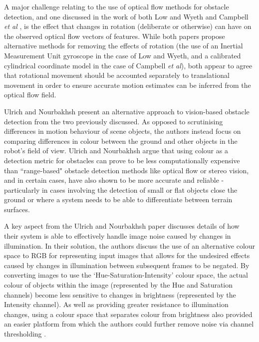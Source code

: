 
A major challenge relating to the use of optical flow methods for obstacle detection, and one discussed in the work of both Low and Wyeth \cite{wyeth} and Campbell \textit{et al} \cite{campbell}, is the effect that changes in rotation (deliberate or otherwise) can have on the observed optical flow vectors of features. While both papers propose alternative methods for removing the effects of rotation (the use of an Inertial Measurement Unit gyroscope in the case of Low and Wyeth, and a calibrated cylindrical coordinate model in the case of Campbell \textit{et al}), both appear to agree that rotational movement should be accounted separately to translational movement in order to ensure accurate motion estimates can be inferred from the optical flow field. 

Ulrich and Nourbakhsh \cite{ulrich-nourbakhsh} present an alternative approach to vision-based obstacle detection from the two previously discussed. As opposed to scrutinising differences in motion behaviour of scene objects, the authors instead focus on comparing differences in colour between the ground and other objects in the robot's field of view. Ulrich and Nourbakhsh argue that using colour as a detection metric for obstacles can prove to be less computationally expensive than ``range-based" obstacle detection methods like optical flow or stereo vision, and in certain cases, have also shown to be more accurate and reliable - particularly in cases involving the detection of small or flat objects close the ground or where a system needs to be able to differentiate between terrain surfaces. 

A key aspect from the Ulrich and Nourbakhsh paper discusses details of how their system is able to effectively handle image noise caused by changes in illumination. In their solution, the authors discuss the use of an alternative colour space to RGB for representing input images that allows for the undesired effects caused by changes in illumination between subsequent frames to be negated. By converting images to use the `Hue-Saturation-Intensity' colour space, the actual colour of objects within the image (represented by the Hue and Saturation channels) become less sensitive to changes in brightness (represented by the Intensity channel). As well as providing greater resistance to illumination changes, using a colour space that separates colour from brightness also provided an easier platform from which the authors could further remove noise via channel thresholding \cite{ulrich-nourbakhsh}. 

